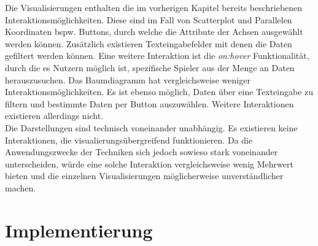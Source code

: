 \documentclass[usegeometry=true]{scrartcl}
\begin{document}
Die Visualisierungen enthalten die im vorherigen Kapitel bereits beschriebenen Interaktionsmöglichkeiten. Diese sind im Fall von Scatterplot und Parallelen Koordinaten bspw. Buttons, durch welche die Attribute der Achsen ausgewählt werden können.
Zusätzlich existieren Texteingabefelder mit denen die Daten gefiltert werden können. Eine weitere Interaktion ist die \textit{on:hover} Funktionalität, durch die es Nutzern möglich ist, spezifische Spieler aus der Menge an Daten herauszusuchen. 
Das Baumdiagramm hat vergleichsweise weniger Interaktionsmöglichkeiten. Es ist ebenso möglich, Daten über eine Texteingabe zu filtern und bestimmte Daten per Button auszuwählen. Weitere Interaktionen existieren allerdings nicht.\\
Die Darstellungen sind technisch voneinander unabhängig. Es existieren keine Interaktionen, die visualierungsübergreifend funktionieren. Da die Anwendungszwecke der Techniken sich jedoch sowieso stark voneinander unterscheiden, würde eine solche Interaktion vergleichsweise wenig Mehrwert bieten und die einzelnen Visualisierungen möglicherweise unverständlicher machen. 

\section{Implementierung}
\end{document}
